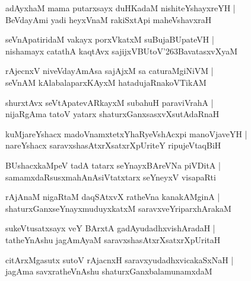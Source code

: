 \documentclass[twoside,12pt,openright]{book}
\def\S{\char'263}
\newcounter{shloka}[chapter]
\begin{document}
\begin{shloka}%
adAyxhaM mama putarxsayx duHKadaM nishiteYshayxreYH |\\
BeVdayAmi yadi heyxVnaM rakiSxtApi maheVshavxraH 
\end{shloka}

\begin{shloka}%
seVnApatiridaM vakayx porxVkatxM suBujaBUpateVH |\\
nishamayx catathA kaqtAvx sajijxVBUtoV\S BavatasxvXyaM 
\end{shloka}

\begin{shloka}%
rAjecnxV niveVdayAmAsa sajAjxM sa caturaMgiNiVM |\\
seVnAM kAlabalaparxKAyxM hatadujaRnakoVTikAM 
\end{shloka}

\begin{shloka}%
shurxtAvx seVtApatevARkayxM subahuH paraviVrahA |\\
nijaRgAma tatoV yatarx shaturxGanxsasxvXsutAdaRnaH 
\end{shloka}

\begin{shloka}%
kuMjareYshacx madoVnamxtetxYhaRyeVshAcxpi manoVjaveYH |\\
nareYshacx saravxshasAtxrXsatxrXpUriteY ripujeVtaqBiH 
\end{shloka}

\begin{shloka}%
BUshacxkaMpeV tadA tatarx seYnayxBAreVNa piVDitA |\\
samamxdaRsusxmahAnAsiVtatxtarx seYneyxV visapaRti
\end{shloka}

\begin{shloka}%
rAjAnaM  nigaRtaM daqSAtxvX ratheVna kanakAMginA |\\
shaturxGanxseYnayxmuduyxkatxM saravxveYriparxhArakaM
\end{shloka}

\begin{shloka}%
sukeVtusatxsayx veY BArxtA gadAyudadhxvishAradaH |\\
tatheYnAshu jagAmAyaM saravxshasAtxrXsatxrXpUritaH 
\end{shloka}

\begin{shloka}%
citArxMgasutx sutoV rAjacnxH saravxyudadhxvicakaSxNaH |\\
jagAma savxratheVnAshu shaturxGanxbalamunamxdaM 
\end{shloka}
\end{document}
